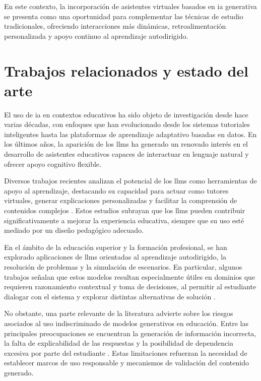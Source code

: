 En este contexto, la incorporación de asistentes virtuales basados en \gls{ia} generativa se presenta como una oportunidad para complementar las técnicas de estudio tradicionales, ofreciendo interacciones más dinámicas, retroalimentación personalizada y apoyo continuo al aprendizaje autodirigido.

\section{Trabajos relacionados y estado del arte}

El uso de \gls{ia} en contextos educativos ha sido objeto de investigación desde hace varias décadas, con enfoques que han evolucionado desde los sistemas tutoriales inteligentes hasta las plataformas de aprendizaje adaptativo basadas en datos. En los últimos años, la aparición de los \glspl{llm} ha generado un renovado interés en el desarrollo de asistentes educativos capaces de interactuar en lenguaje natural y ofrecer apoyo cognitivo flexible.

Diversos trabajos recientes analizan el potencial de los \glspl{llm} como herramientas de apoyo al aprendizaje, destacando su capacidad para actuar como tutores virtuales, generar explicaciones personalizadas y facilitar la comprensión de contenidos complejos \parencite{kasneci2023chatgpt}. Estos estudios subrayan que los \glspl{llm} pueden contribuir significativamente a mejorar la experiencia educativa, siempre que su uso esté mediado por un diseño pedagógico adecuado.

En el ámbito de la educación superior y la formación profesional, se han explorado aplicaciones de \glspl{llm} orientadas al aprendizaje autodirigido, la resolución de problemas y la simulación de escenarios. En particular, algunos trabajos señalan que estos modelos resultan especialmente útiles en dominios que requieren razonamiento contextual y toma de decisiones, al permitir al estudiante dialogar con el sistema y explorar distintas alternativas de solución \parencite{chang2024chatgpt, deng2024chatgpt}.

No obstante, una parte relevante de la literatura advierte sobre los riesgos asociados al uso indiscriminado de modelos generativos en educación. Entre las principales preocupaciones se encuentran la generación de información incorrecta, la falta de explicabilidad de las respuestas y la posibilidad de dependencia excesiva por parte del estudiante \parencite{huang2024hallucination, gallegos2024bias}. Estas limitaciones refuerzan la necesidad de establecer marcos de uso responsable y mecanismos de validación del contenido generado.

